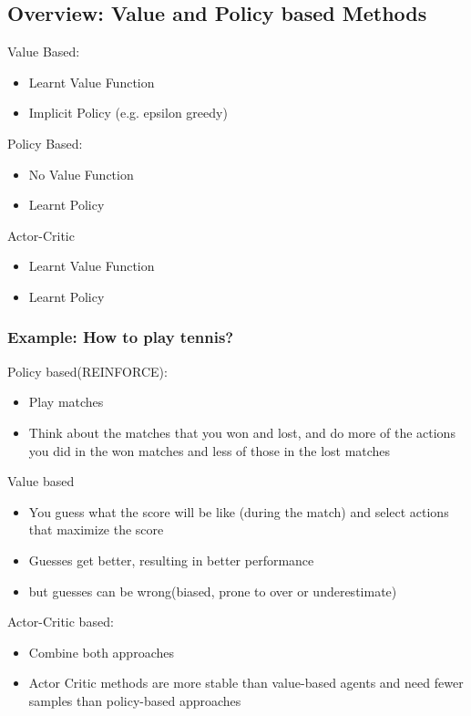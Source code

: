\subsection{Overview: Value and Policy based Methods}
Value Based:
\begin{itemize}
    \item Learnt Value Function
    \item Implicit Policy (e.g. epsilon greedy)
\end{itemize}
Policy Based:
\begin{itemize}
    \item No Value Function
    \item Learnt Policy
\end{itemize}
Actor-Critic
\begin{itemize}
    \item Learnt Value Function
    \item Learnt Policy
\end{itemize}

\subsubsection*{Example: How to play tennis?}
Policy based(REINFORCE):
\begin{itemize}
    \item Play matches
    \item Think about the matches that you won and lost, and do more of the actions you did in the won matches and less of those in the lost matches
\end{itemize}
Value based
\begin{itemize}
    \item You guess what the score will be like (during the match) and select actions that maximize the score
    \item Guesses get better, resulting in better performance
    \item but guesses can be wrong(biased, prone to over or underestimate)
\end{itemize}
Actor-Critic based:
\begin{itemize}
    \item Combine both approaches
    \item Actor Critic methods are more stable than value-based agents and need fewer samples than policy-based approaches
\end{itemize}
